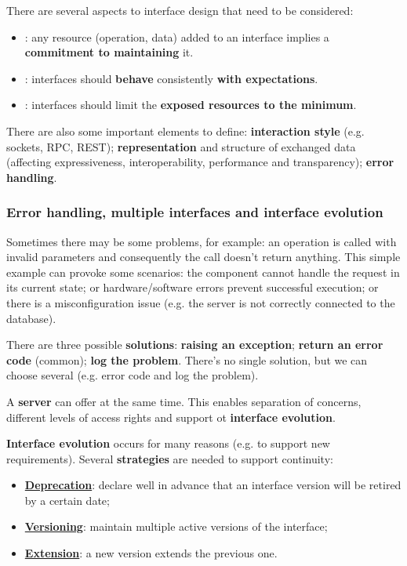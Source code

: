 \highspace
There are several aspects to interface design that need to be considered:
\begin{itemize}
    \item {}: any resource (operation, data) added to an interface implies a \textbf{commitment to maintaining} it.

    \item {}: interfaces should \textbf{behave} consistently \textbf{with expectations}.

    \item {}: interfaces should limit the \textbf{exposed resources to the minimum}.
\end{itemize}
There are also some important elements to define: \textbf{interaction style} (e.g. sockets, RPC, REST); \textbf{representation} and structure of exchanged data (affecting expressiveness, interoperability, performance and transparency); \textbf{error handling}.

\newpage

\subsubsection{Error handling, multiple interfaces and interface evolution}

Sometimes there may be some problems, for example: an operation is called with invalid parameters and consequently the call doesn't return anything. This simple example can provoke some scenarios: the component cannot handle the request in its current state; or hardware/software errors prevent successful execution; or there is a misconfiguration issue (e.g. the server is not correctly connected to the database).

There are three possible \textbf{solutions}: \textbf{raising an exception}; \textbf{return an error code} (common); \textbf{log the problem}. There's no single solution, but we can choose several (e.g. error code and log the problem).

\highspace
A \textbf{server} can offer  at the same time. This enables separation of concerns, different levels of access rights and support ot \textbf{interface evolution}.

\highspace
\textbf{Interface evolution} occurs for many reasons (e.g. to support new requirements). Several \textbf{strategies} are needed to support continuity:
\begin{itemize}
    \item \textbf{\underline{Deprecation}}: declare well in advance that an interface version will be retired by a certain date;

    \item \textbf{\underline{Versioning}}: maintain multiple active versions of the interface;

    \item \textbf{\underline{Extension}}: a new version extends the previous one.
\end{itemize}

